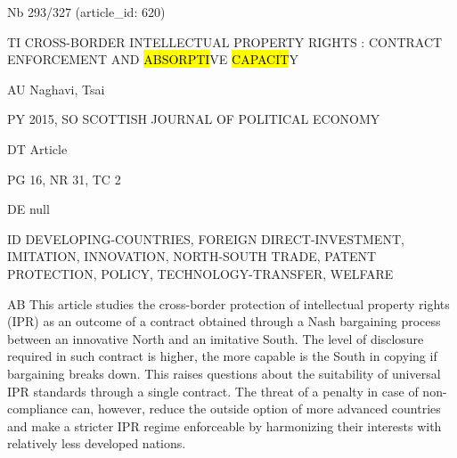 \documentclass[a4paper]{article}
\begin{document}
\vspace*{-2cm}
Nb \tabto{0cm}293/327 (article\_id: 620)\par
TI \tabto{0cm}CROSS-BORDER INTELLECTUAL PROPERTY RIGHTS : CONTRACT ENFORCEMENT AND \hl{ABSORPTI}VE \hl{CAPACIT}Y\par
AU \tabto{0cm}Naghavi, Tsai\par
PY \tabto{0cm}2015, SO SCOTTISH JOURNAL OF POLITICAL ECONOMY\par
DT \tabto{0cm}Article\par
PG \tabto{0cm}16, NR 31, TC 2\par
DE \tabto{0cm}null\par
ID \tabto{0cm}DEVELOPING-COUNTRIES, FOREIGN DIRECT-INVESTMENT, IMITATION, INNOVATION, NORTH-SOUTH TRADE, PATENT PROTECTION, POLICY, TECHNOLOGY-TRANSFER, WELFARE\par
AB \tabto{0cm}This article studies the cross-border protection of intellectual property rights (IPR) as an outcome of a contract obtained through a Nash bargaining process between an innovative North and an imitative South. The level of disclosure required in such contract is higher, the more capable is the South in copying if bargaining breaks down. This raises questions about the suitability of universal IPR standards through a single contract. The threat of a penalty in case of non-compliance can, however, reduce the outside option of more advanced countries and make a stricter IPR regime enforceable by harmonizing their interests with relatively less developed nations.\par
\clearpage
\end{document}
